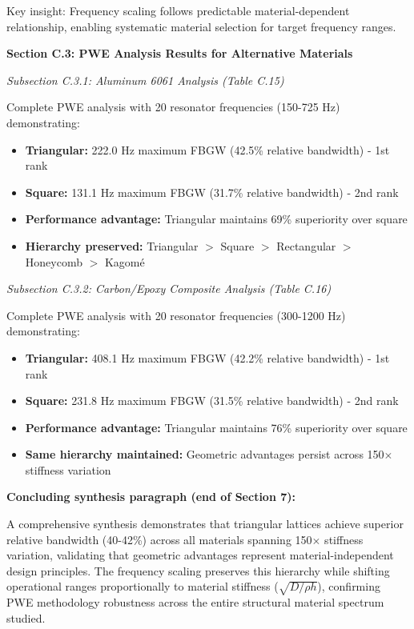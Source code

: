 \documentclass[11pt,a4paper]{article}
\newenvironment{changesbox}{%
    \par\medskip\noindent{\color{changescolor}\rule{\linewidth}{2pt}}\par
    \noindent{\color{changescolor}\bfseries Manuscript Changes}\par\smallskip
}{%
    \par\noindent{\color{changescolor}\rule{\linewidth}{0.5pt}}\medskip
}
\begin{document}
\begin{changesbox}
Key insight: Frequency scaling follows predictable material-dependent relationship, enabling systematic material selection for target frequency ranges.

\textbf{Section C.3: PWE Analysis Results for Alternative Materials}

\textit{Subsection C.3.1: Aluminum 6061 Analysis (Table C.15)}

Complete PWE analysis with 20 resonator frequencies (150-725 Hz) demonstrating:
\begin{itemize}
    \item \textbf{Triangular:} 222.0 Hz maximum FBGW (42.5\% relative bandwidth) - 1st rank
    \item \textbf{Square:} 131.1 Hz maximum FBGW (31.7\% relative bandwidth) - 2nd rank
    \item \textbf{Performance advantage:} Triangular maintains 69\% superiority over square
    \item \textbf{Hierarchy preserved:} Triangular $>$ Square $>$ Rectangular $>$ Honeycomb $>$ Kagom\'{e}
\end{itemize}

\textit{Subsection C.3.2: Carbon/Epoxy Composite Analysis (Table C.16)}

Complete PWE analysis with 20 resonator frequencies (300-1200 Hz) demonstrating:
\begin{itemize}
    \item \textbf{Triangular:} 408.1 Hz maximum FBGW (42.2\% relative bandwidth) - 1st rank
    \item \textbf{Square:} 231.8 Hz maximum FBGW (31.5\% relative bandwidth) - 2nd rank
    \item \textbf{Performance advantage:} Triangular maintains 76\% superiority over square
    \item \textbf{Same hierarchy maintained:} Geometric advantages persist across 150$\times$ stiffness variation
\end{itemize}

\textbf{Concluding synthesis paragraph (end of Section 7):}

A comprehensive synthesis demonstrates that triangular lattices achieve superior relative bandwidth (40-42\%) across all materials spanning 150$\times$ stiffness variation, validating that geometric advantages represent material-independent design principles. The frequency scaling preserves this hierarchy while shifting operational ranges proportionally to material stiffness ($\sqrt{D/\rho h}$), confirming PWE methodology robustness across the entire structural material spectrum studied.


\end{changesbox}
\end{document}
